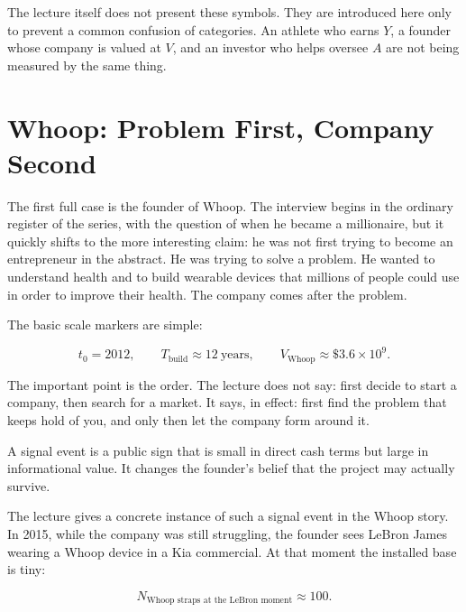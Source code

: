 \begin{remark}
The lecture itself does not present these symbols. They are introduced here only to prevent a common confusion of categories. An athlete who earns \(Y\), a founder whose company is valued at \(V\), and an investor who helps oversee \(A\) are not being measured by the same thing.
\end{remark}

\section{Whoop: Problem First, Company Second}

The first full case is the founder of Whoop. The interview begins in the ordinary register of the series, with the question of when he became a millionaire, but it quickly shifts to the more interesting claim: he was not first trying to become an entrepreneur in the abstract. He was trying to solve a problem. He wanted to understand health and to build wearable devices that millions of people could use in order to improve their health. The company comes after the problem.

The basic scale markers are simple:

\begin{equation}
t_0 = 2012,
\qquad
T_{\text{build}} \approx 12\ \text{years},
\qquad
V_{\text{Whoop}} \approx \$3.6 \times 10^9.
\end{equation}

The important point is the order. The lecture does not say: first decide to start a company, then search for a market. It says, in effect: first find the problem that keeps hold of you, and only then let the company form around it.

\begin{definition}
A signal event is a public sign that is small in direct cash terms but large in informational value. It changes the founder's belief that the project may actually survive.
\end{definition}

The lecture gives a concrete instance of such a signal event in the Whoop story. In 2015, while the company was still struggling, the founder sees LeBron James wearing a Whoop device in a Kia commercial. At that moment the installed base is tiny:

\begin{equation}
N_{\text{Whoop straps at the LeBron moment}} \approx 100.
\end{equation}

